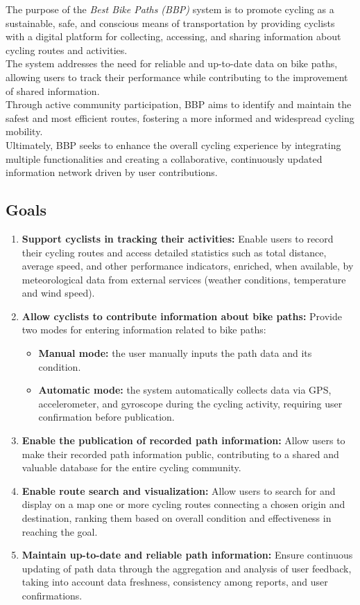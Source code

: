 The purpose of the \textit{Best Bike Paths (BBP)} system is to promote cycling as a sustainable, safe, and conscious means of transportation by providing cyclists with a digital platform for collecting, accessing, and sharing information about cycling routes and activities.\\
The system addresses the need for reliable and up-to-date data on bike paths, allowing users to track their performance while contributing to the improvement of shared information.\\
Through active community participation, BBP aims to identify and maintain the safest and most efficient routes, fostering a more informed and widespread cycling mobility.\\
Ultimately, BBP seeks to enhance the overall cycling experience by integrating multiple functionalities and creating a collaborative, continuously updated information network driven by user contributions.\\ 
\subsection{Goals}
\begin{enumerate}[label=G\arabic*.]
\item \textbf{Support cyclists in tracking their activities:} Enable users to record their cycling routes and access detailed statistics such as total distance, average speed, and other performance indicators, enriched, when available, by meteorological data from external services (weather conditions, temperature and wind speed).
\item \textbf{Allow cyclists to contribute information about bike paths:} Provide two modes for entering information related to bike paths:
\begin{itemize}
    \item \textbf{Manual mode:} the user manually inputs the path data and its condition.
    \item \textbf{Automatic mode:} the system automatically collects data via GPS, accelerometer, and gyroscope during the cycling activity, requiring user confirmation before publication.
\end{itemize}

\item \textbf{Enable the publication of recorded path information:} Allow users to make their recorded path information public, contributing to a shared and valuable database for the entire cycling community.
\item \textbf{Enable route search and visualization:} Allow users to search for and display on a map one or more cycling routes connecting a chosen origin and destination, ranking them based on overall condition and effectiveness in reaching the goal.
\item \textbf{Maintain up-to-date and reliable path information:} Ensure continuous updating of path data through the aggregation and analysis of user feedback, taking into account data freshness, consistency among reports, and user confirmations.
\end{enumerate}